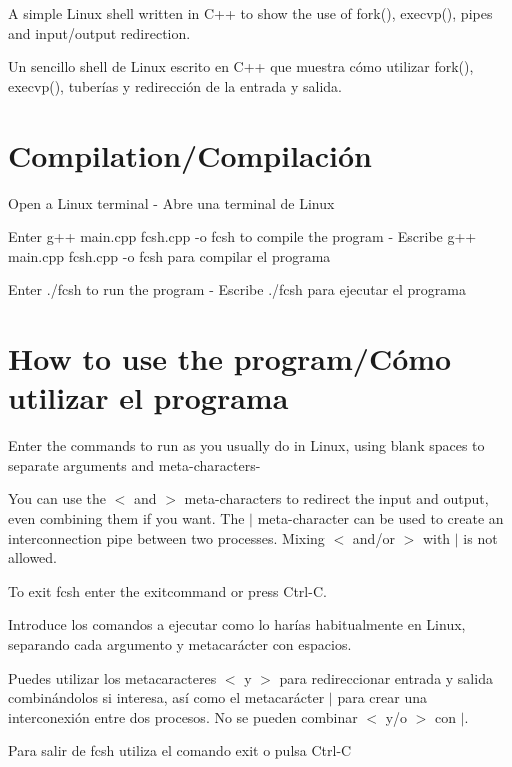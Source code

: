 A simple Linux shell written in C++ to show the use of {\ttfamily fork()}, {\ttfamily execvp()}, pipes and input/output redirection.

Un sencillo shell de Linux escrito en C++ que muestra cómo utilizar {\ttfamily fork()}, {\ttfamily execvp()}, tuberías y redirección de la entrada y salida.



\section*{Compilation/\-Compilación }

Open a Linux terminal -\/ Abre una terminal de Linux

Enter {\ttfamily g++ main.\-cpp fcsh.\-cpp -\/o fcsh} to compile the program -\/ Escribe {\ttfamily g++ main.\-cpp fcsh.\-cpp -\/o fcsh} para compilar el programa

Enter {\ttfamily ./fcsh} to run the program -\/ Escribe {\ttfamily ./fcsh} para ejecutar el programa

\section*{How to use the program/\-Cómo utilizar el programa }

Enter the commands to run as you usually do in Linux, using blank spaces to separate arguments and meta-\/characters-\/

You can use the {\ttfamily $<$} and {\ttfamily $>$} meta-\/characters to redirect the input and output, even combining them if you want. The {\ttfamily $\vert$} meta-\/character can be used to create an interconnection pipe between two processes. Mixing {\ttfamily $<$} and/or {\ttfamily $>$} with {\ttfamily $\vert$} is not allowed.

To exit {\ttfamily fcsh} enter the {\ttfamily exit}command or press {\ttfamily Ctrl-\/\-C}.

Introduce los comandos a ejecutar como lo harías habitualmente en Linux, separando cada argumento y metacarácter con espacios.

Puedes utilizar los metacaracteres {\ttfamily $<$} y {\ttfamily $>$} para redireccionar entrada y salida combinándolos si interesa, así como el metacarácter {\ttfamily $\vert$} para crear una interconexión entre dos procesos. No se pueden combinar {\ttfamily $<$} y/o {\ttfamily $>$} con {\ttfamily $\vert$}.

Para salir de {\ttfamily fcsh} utiliza el comando {\ttfamily exit} o pulsa {\ttfamily Ctrl-\/\-C}


